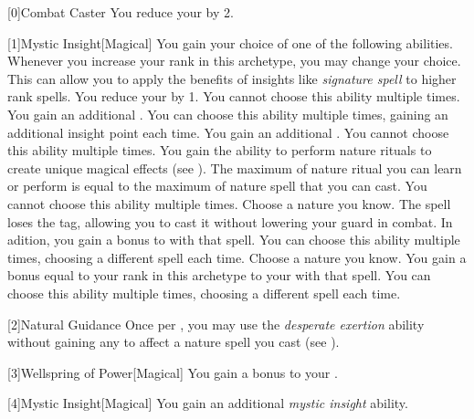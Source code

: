         [0]{Combat Caster} You reduce your  by 2.

        [1]{Mystic Insight}[Magical]
        You gain your choice of one of the following abilities.
        Whenever you increase your rank in this archetype, you may change your choice.
        This can allow you to apply the benefits of insights like \textit{signature spell} to higher rank spells.
        {
             You reduce your  by 1.
                You cannot choose this ability multiple times.
             You gain an additional .
                You can choose this ability multiple times, gaining an additional insight point each time.
             You gain an additional .
                You cannot choose this ability multiple times.
             You gain the ability to perform nature rituals to create unique magical effects (see ).
                The maximum  of nature ritual you can learn or perform is equal to the maximum  of nature spell that you can cast.
                You cannot choose this ability multiple times.
             Choose a nature  you know.
                The spell loses the  tag, allowing you to cast it without lowering your guard in combat.
                In adition, you gain a  bonus to  with that spell.
                You can choose this ability multiple times, choosing a different spell each time.
             Choose a nature  you know.
                You gain a bonus equal to your rank in this archetype to your  with that spell.
                You can choose this ability multiple times, choosing a different spell each time.
        }

        [2]{Natural Guidance} Once per , you may use the \textit{desperate exertion} ability without gaining any  to affect a nature spell you cast (see ).

        [3]{Wellspring of Power}[Magical]
        You gain a  bonus to your  .

        [4]{Mystic Insight}[Magical]
        You gain an additional \textit{mystic insight} ability.

